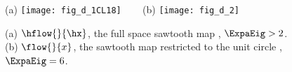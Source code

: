 


\begin{figure}
  \centering
{(a)}
\texttt{[image: fig\_d\_1CL18]}
~~~
{(b)}
\texttt{[image: fig\_d\_2]}
  \caption{\label{fig-d-1}
(a) $\hflow{}{\hx}$, the full space sawtooth map , $\ExpaEig >
2$.
(b) $\flow{}{x}$, the sawtooth map restricted to the unit circle
, $\ExpaEig=6$.
            }
\end{figure}
%
